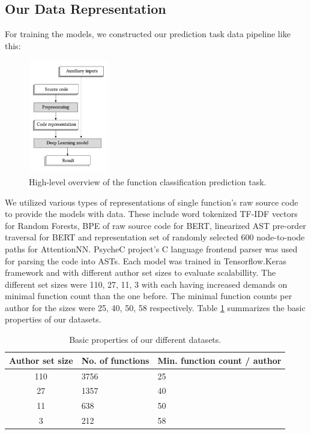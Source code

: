 \documentclass[conference]{IEEEtran}
\begin{document}
\subsection{Our Data Representation}
For training the models, we constructed our prediction task data pipeline like this:

\begin{figure}[!t]
    \centering
    \includegraphics[width=3.5cm,height=5cm]{figures/high_level_prediciton_task.png}
    \caption{\cite{compiler_based} High-level overview of the function classification prediction task.}
    \label{fig:predictive_task}
\end{figure}

We utilized various 
types of representations of single function's raw source code to provide the models with data.
These include word tokenized TF-IDF vectors for Random Forests, BPE of raw source code for
BERT, linearized AST pre-order traversal for BERT and representation set of randomly selected 600 node-to-node paths for AttentionNN.  
PsycheC project's C language frontend parser \cite{psychec} was used for parsing the code into ASTs. Each model was trained in Tensorflow.Keras framework and with different author set sizes to evaluate scalabillity. The different set sizes were
110, 27, 11, 3 with each having increased demands on minimal function count than the one before. The minimal function counts per author for the sizes were 25, 40, 50, 58 respectively.
Table \ref{tab:basic_props} summarizes the basic properties of our datasets.

\begin{table}[!b]
    \centering
    \caption{Basic properties of our different datasets.}
    \label{tab:basic_props} %
    \begin{tabular}{|c|l|l|}
        \hline
        \textbf{Author set size} & \textbf{No. of functions} & \textbf{Min. function count / author} \\ 
        \hline
        110 & 3756 & 25 \\ 
        \hline
        27 & 1357 & 40 \\ 
        \hline
        11 & 638 & 50 \\ 
        \hline
        3 & 212 & 58 \\ 
        \hline
    \end{tabular}
\end{table}
\end{document}
